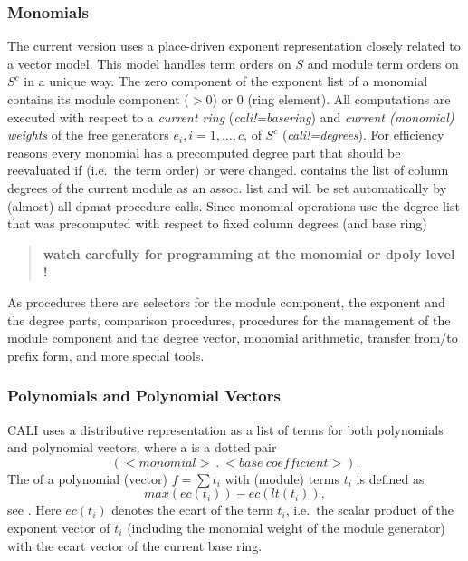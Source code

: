\subsubsection{Monomials}

The current version uses a place-driven exponent representation
closely related to a vector model. This model handles term orders  on $S$
and module term orders on $S^c$ in a unique way. The zero component of the
exponent list of a monomial contains its module component ($>0$) or 0
(ring element). All computations are executed with respect to a
\emph{current ring}
(\emph{cali!=basering})
and \emph{current (monomial) weights} of the free generators
$e_i, i=1,\ldots,c$, of $S^c$
(\emph{cali!=degrees}).
For efficiency reasons every monomial has a
precomputed degree part that should be reevaluated if 
(i.e.\ the term order) or  were
changed.  contains the list of column degrees of
the current module as an assoc. list and will be set automatically by
(almost) all dpmat procedure calls. Since monomial operations use the
degree list that was precomputed with respect to fixed column degrees
(and base ring)
\begin{quote}
\textbf{watch carefully for  programming at the monomial
or dpoly level !}
\end{quote}

As procedures there are selectors for the module component, the exponent and
the degree parts, comparison procedures, procedures for the management of
the module component and the degree vector, monomial arithmetic, transfer
from/to prefix form, and more special tools.

\subsubsection{Polynomials and Polynomial Vectors}

CALI uses a distributive representation as a list of terms for both
polynomials and polynomial vectors, where a  is a dotted
pair
\[(<monomial>\ .\ <base\ coefficient>).\]
The  of a polynomial (vector) $f=\sum{t_i}$ with (module)
terms $t_i$ is defined as \[max(ec(t_i))-ec(lt(t_i)),\] see
\cite{Graebe:94}. Here $ec(t_i)$ denotes the ecart of the term $t_i$, i.e.\
the scalar product of the exponent vector of $t_i$ (including the
monomial weight of the module generator) with the ecart vector of the
current base ring.

